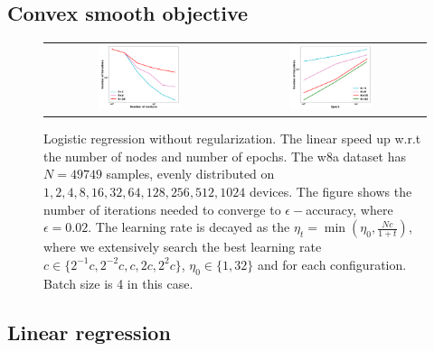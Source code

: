 \subsection{Convex smooth objective}

\begin{figure}[h!]
\centering
\begin{tabular}{cc}
	\includegraphics[width=0.45\textwidth]{fig/paper-cvxsmoothspeedupNodesT-min-w8a-epsilon0134-reg0.pdf} & 
\includegraphics[width=0.45\textwidth]{fig/paper-cvxsmoothspeedupEpochsT-min-w8a-epsilon0134-reg0.pdf} \\
\end{tabular}
	\caption{Logistic regression without regularization. The linear speed up w.r.t the number of nodes and number of epochs. The w8a dataset has $N=49749$ samples, evenly distributed on $1, 2, 4, 8, 16, 32, 64, 128, 256, 512, 1024$ devices. The figure shows the number of iterations needed to converge to $\epsilon-$accuracy, where $\epsilon=0.02$. The learning rate is decayed as the $\eta_t = \min(\eta_0, \frac{Nc}{1 + t})$, where we extensively search the best learning rate $c \in \{2^{-1}c, 2^{-2}c, c, 2c, 2^{2}c\}$, $\eta_0 \in \{1, 32\}$ and for each configuration. Batch size is 4 in this case.}
\end{figure}




\subsection{Linear regression}






